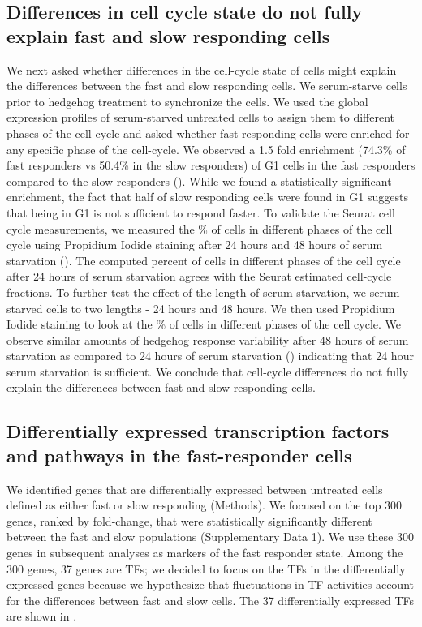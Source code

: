 \subsection{Differences in cell cycle state do not fully explain fast and slow responding cells}

We next asked whether differences in the cell-cycle state of cells might explain the differences between the fast and slow responding cells. We serum-starve cells prior to hedgehog treatment to synchronize the cells. We used the global expression profiles of serum-starved untreated cells to assign them to different phases of the cell cycle and asked whether fast responding cells were enriched for any specific phase of the cell-cycle. We observed a 1.5 fold enrichment (74.3\% of fast responders vs 50.4\% in the slow responders) of G1 cells in the fast responders compared to the slow responders (). While we found a statistically significant enrichment, the fact that half of slow responding cells were found in G1 suggests that being in G1 is not sufficient to respond faster. To validate the Seurat cell cycle measurements, we measured the \% of cells in different phases of the cell cycle using Propidium Iodide staining after 24 hours and 48 hours of serum starvation (). The computed percent of cells in different phases of the cell cycle after 24 hours of serum starvation agrees with the Seurat estimated cell-cycle fractions. To further test the effect of the length of serum starvation, we serum starved cells to two lengths - 24 hours and 48 hours. We then used Propidium Iodide staining to look at the \% of cells in different phases of the cell cycle. We observe similar amounts of hedgehog response variability after 48 hours of serum starvation as compared to 24 hours of serum starvation () indicating that 24 hour serum starvation is sufficient. We conclude that cell-cycle differences do not fully explain the differences between fast and slow responding cells.
\subsection{Differentially expressed transcription factors and pathways in the fast-responder cells}

We identified genes that are differentially expressed between untreated cells defined as either fast or slow responding (Methods). We focused on the top 300 genes, ranked by fold-change, that were statistically significantly different between the fast and slow populations (Supplementary Data 1). We use these 300 genes in subsequent analyses as markers of the fast responder state. Among the 300 genes, 37 genes are TFs; we decided to focus on the TFs in the differentially expressed genes because we hypothesize that fluctuations in TF activities account for the differences between fast and slow cells. The 37 differentially expressed TFs are shown in . 

